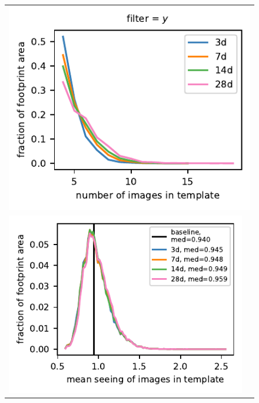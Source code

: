 \documentclass[preprintm,linenumbers]{aastex631}
\begin{document}
     \begin{figure}[h]
			\centering
%				
%				
							\begin{tabular}{@{}c@{}c@{}}
			\multicolumn{2}{c}{\includegraphics{results/histograms_templates_tscale/hist_first_year_one_snap_v4_0_10yrs_db_noDD_noTwi_doALLTemplateMetrics_reduceNTemplate_y_noDD_noTwi.pdf}} \\
					\includegraphics{results/histograms_templates_tscale/hist_first_year_one_snap_v4_0_10yrs_db_noDD_noTwi_doALLTemplateMetrics_reduceSeeingTemplate_y_noDD_noTwi.pdf} &

\end{tabular}
\end{figure}
\end{document}
